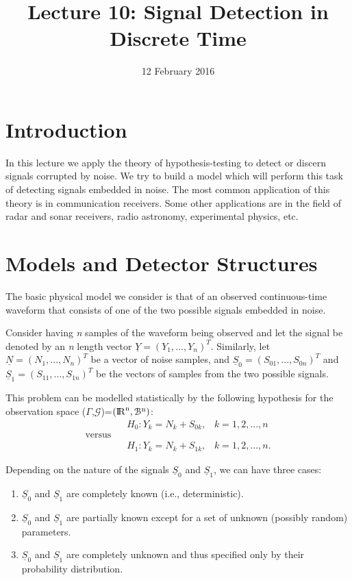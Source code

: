 \documentclass[a4paper,english,12pt]{article}
\title{Lecture 10: Signal Detection in Discrete Time}
\date{12 February 2016}
\begin{document}
\maketitle

\section{Introduction}
In this lecture we apply the theory of hypothesis-testing to detect or discern signals corrupted by noise. We try to build a model which will perform this task of detecting signals embedded in noise. The most common application of this theory is in communication receivers. Some other applications are in the field of radar and sonar receivers, radio astronomy, experimental physics, etc.

\section{Models and Detector Structures}
The basic physical model we consider is that of an observed continuous-time waveform that consists of one of the two possible signals embedded in noise.

Consider having \textit{n} samples of the waveform being observed and let the signal be denoted by an \textit{n} length vector $\underline{Y}=(Y_{1},...,Y_{n})^{T}$. Similarly, let $\underline{N}=(N_{1},...,N_{n})^{T}$ be a vector of noise samples, and $\underline{S}_{0}=(S_{01},...,S_{0n})^{T}$ and $\underline{S}_{1}=(S_{11},...,S_{1n})^{T}$ be the vectors of samples from the two possible signals.

This problem can be modelled statistically by the following hypothesis for the observation space ($\Gamma$,$\mathcal{G}$)=$({\rm I\!R}^{\text{n}},\mathcal{B}^{\text{n}})$:
\begin{equation}
\begin{split}
\label{hypothesis}
&H_{0}: Y_{k} = N_{k}+S_{0k}, \hspace{10pt}k=1,2,...,n\\
\text{versus}\hspace{10pt}&
\\&H_{1}: Y_{k} = N_{k}+S_{1k}, \hspace{10pt}k=1,2,...,n.	
\end{split}
\end{equation}

Depending on the nature of the signals $\underline{S}_{0}$ and $\underline{S}_{1}$, we can have three cases: 
\begin{enumerate}
\item $\underline{S}_{0}$ and $\underline{S}_{1}$ are completely known (i.e., deterministic).
\item $\underline{S}_{0}$ and $\underline{S}_{1}$ are partially known except for a set of unknown (possibly random) parameters.
\item $\underline{S}_{0}$ and $\underline{S}_{1}$ are completely unknown and thus specified only by their probability distribution.
\end{enumerate}
\end{document}
